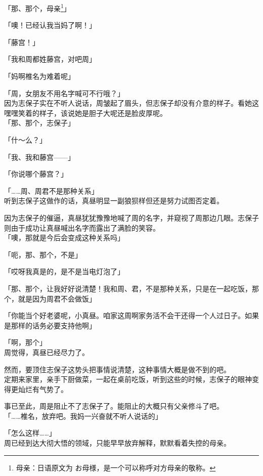 「那、那个，母亲\footnote{母亲：日语原文为 {\jpfont お母様}，是一个可以称呼对方母亲的敬称。}」

「噢！已经认我当妈了啊！」

「藤宫！」

「我和周都姓藤宫，对吧周」

「妈啊椎名为难着呢」

「周，女朋友不用名字喊可不行哦？」\\

因为志保子实在不听人说话，周皱起了眉头，但志保子却没有介意的样子。看她这嘿嘿笑着的样子，该说她是胆子大呢还是脸皮厚呢。\\

「那、那个，志保子」

「什～么？」

「我、我和藤宫——」

「你说哪个藤宫？」

「……周、周君不是那种关系」\\

听到志保子这做作的话，真昼明显一副狼狈样但还是努力试图否定着。

因为志保子的催逼，真昼犹犹豫豫地喊了周的名字，并窥视了周那边几眼。志保子则由于成功让真昼喊出名字而露出了满脸的笑容。\\

「噢，那就是今后会变成这种关系吗」

「呃，那、那个，不是」

「哎呀我真是的，是不是当电灯泡了」

「那、那个，让我好好说清楚！我和周、君，不是那种关系，只是在一起吃饭，那个，就是因为周君不会做饭」

「你能当个好老婆呢，小真昼。咱家这周啊家务活不会干还得一个人过日子。如果是那样的话务必要支持他啊」

「啊，那个」\\

周觉得，真昼已经尽力了。

然而，要顶住志保子这势头把事情说清楚，这种事情大概是做不到的吧。\\

定期来家里，亲手下厨做菜，一起在桌前吃饭，听到这些的时候，志保子的眼神变得更灿烂有气势了。

事已至此，周是阻止不了志保子了。能阻止的大概只有父亲修斗了吧。\\

「……椎名，放弃吧。我妈一兴奋就不听人说话的」

「怎么这样……」\\

周已经到达大彻大悟的领域，只能早早放弃解释，默默看着失控的母亲。
